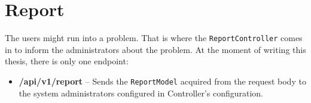 \section{Report}
The users might run into a problem. That is where the \texttt{ReportControl\-ler} comes in to inform the administrators about the problem. At the moment of writing this thesis, there is only one endpoint:
\begin{itemize}
    \item \textbf{\text{[POST]} /api/v1/report} -- Sends the \texttt{ReportModel} acquired from the request body to the system administrators configured in Controller's configuration.
\end{itemize}

